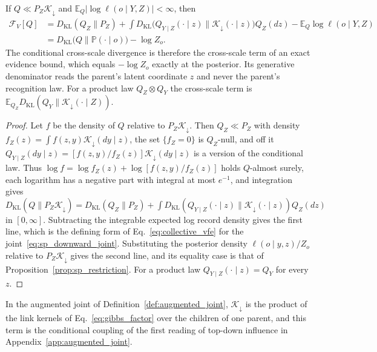 \begin{proposition}\label{prop:sp_downward}
If $Q\ll P_Z\mathcal K_\downarrow$ and $\mathbb E_Q|\log\ell(o\mid Y,Z)|<\infty$, then
\begin{equation}
\begin{split}
\mathcal F_V[Q]
&=D_{\mathrm{KL}}(Q_Z\|P_Z)+\int D_{\mathrm{KL}}\big(Q_{Y\mid Z}(\cdot\mid z)\big\|\mathcal K_\downarrow(\cdot\mid z)\big)Q_Z(dz)-\mathbb E_Q\log\ell(o\mid Y,Z)\\
&=D_{\mathrm{KL}}\big(Q\|\mathbb P(\cdot\mid o)\big)-\log Z_o.
\end{split}
\label{eq:sp_downward_identity}
\end{equation}
The conditional cross-scale divergence is therefore the cross-scale term of an exact evidence bound, which equals $-\log Z_o$ exactly at the posterior. Its generative denominator reads the parent's latent coordinate $z$ and never the parent's recognition law. For a product law $Q_Z\otimes Q_Y$ the cross-scale term is $\mathbb E_{Q_Z}D_{\mathrm{KL}}(Q_Y\|\mathcal K_\downarrow(\cdot\mid Z))$.
\end{proposition}
\begin{proof}
Let $f$ be the density of $Q$ relative to $P_Z\mathcal K_\downarrow$. Then $Q_Z\ll P_Z$ with density $f_Z(z)=\int f(z,y)\mathcal K_\downarrow(dy\mid z)$, the set $\{f_Z=0\}$ is $Q_Z$-null, and off it $Q_{Y\mid Z}(dy\mid z)=[f(z,y)/f_Z(z)]\mathcal K_\downarrow(dy\mid z)$ is a version of the conditional law. Thus $\log f=\log f_Z(z)+\log[f(z,y)/f_Z(z)]$ holds $Q$-almost surely, each logarithm has a negative part with integral at most $e^{-1}$, and integration gives
$D_{\mathrm{KL}}(Q\|P_Z\mathcal K_\downarrow)=D_{\mathrm{KL}}(Q_Z\|P_Z)+\int D_{\mathrm{KL}}(Q_{Y\mid Z}(\cdot\mid z)\|\mathcal K_\downarrow(\cdot\mid z))Q_Z(dz)$ in $[0,\infty]$. Subtracting the integrable expected log record density gives the first line, which is the defining form of Eq.~\eqref{eq:collective_vfe} for the joint~\eqref{eq:sp_downward_joint}. Substituting the posterior density $\ell(o\mid y,z)/Z_o$ relative to $P_Z\mathcal K_\downarrow$ gives the second line, and its equality case is that of Proposition~\ref{prop:sp_restriction}. For a product law $Q_{Y\mid Z}(\cdot\mid z)=Q_Y$ for every $z$.
\end{proof}
In the augmented joint of Definition~\ref{def:augmented_joint}, $\mathcal K_\downarrow$ is the product of the link kernels of Eq.~\eqref{eq:gibbs_factor} over the children of one parent, and this term is the conditional coupling of the first reading of top-down influence in Appendix~\ref{app:augmented_joint}.
